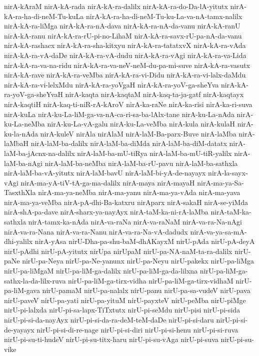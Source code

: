 {nirA-kAraM
nirA-kA-rada
nirA-kA-ra-dalilx
nirA-kA-ra-do-Da-lA-yitutx
nirA-kA-ra-ha-di-neM-Tu-kuLa
nirA-kA-ra-ha-di-neM-Tu-ku-La-va-nA-tamx-nalilx
nirA-kA-ra-liMga
nirA-kA-ra-nA-dava
nirA-kA-ra-nA-da-vanu
nirA-kA-ranU
nirA-kA-ranu
nirA-kA-ra-rU-pi-no-LihaM
nirA-kA-ra-savx-rU-pa-nA-da-vanu
nirA-kA-rashacx
nirA-kA-ra-sha-kitxyu
nirA-kA-ra-tatatxvX
nirA-kA-ra-vAda
nirA-kA-ra-vA-daDe
nirA-kA-ra-vA-dudu
nirA-kA-ra-vAgi
nirA-kA-ra-va-Lida
nirA-kA-ra-va-na-ridu
nirA-kA-ra-va-neV-neM-du-pa-mi-suve
nirA-kA-ra-vasutx
nirA-kA-rave
nirA-kA-ra-veMba
nirA-kA-ra-vi-Didu
nirA-kA-ra-vi-lalx-daMdu
nirA-kA-ra-vi-lelxMdu
nirA-kA-ra-yoVgaH
nirA-kA-ra-yoV-ga-sheYva
nirA-kA-ra-yoV-ga-sheYvaH
nirA-kaqta
nirA-kaqtaM
nirA-kaq-ta-ja-gatf
nirA-kaqtayx
nirA-kaqtiH
nirA-kaq-ti-niR-rA-kAroV
nirA-ka-raNe
nirA-ka-risi
nirA-ka-ri-suva
nirA-kuLa
nirA-ku-La-liM-ga-va-nA-ca-ri-sa-ba-lAlx-tane
nirA-ku-La-nAda
nirA-ku-La-neMba
nirA-ku-La-vA-galu
nirA-ku-La-veMba
nirA-kula
nirA-kulaH
nirA-ku-la-nAda
nirA-kuleV
nirAla
nirAlaM
nirA-laM-Ba-parx-Buve
nirA-laMba
nirA-laMbaH
nirA-laM-ba-dalilx
nirA-laM-ba-diMda
nirA-laM-ba-diM-datatx
nirA-laM-ba-jAcnx-na-dalilx
nirA-laM-ba-mU-tiRya
nirA-laM-ba-mU-tiR-yalilx
nirA-laM-ba-nAgi
nirA-laM-ba-neMba
nirA-laM-ba-rU-pavu
nirA-laM-ba-sathxla
nirA-laM-ba-vA-yitutx
nirA-laM-bavU
nirA-laM-bi-yA-de-nayayx
nirA-la-sayx-vAgi
nirA-ma-yA-tiV-tA-ga-ma-dalilx
nirA-maya
nirA-mayaH
nirA-ma-ya-Sa-TasxthXla
nirA-ma-ya-neMba
nirA-ma-yanu
nirA-ma-ya-vAda
nirA-ma-yava
nirA-ma-ya-veMba
nirA-pA-dhi-Ba-katxru
nirAparx
nirA-sakaH
nirA-se-yiMda
nirA-shA-pa-dave
nirA-sharx-ya-nayAyx
nirA-taM-ka-ni-rA-laMba
nirA-taM-ka-sathxla
nirA-tamx-ka-nAda
nirA-va-raNa
nirA-va-raNaM
nirA-va-ra-Na-nAgi
nirA-va-ra-Nana
nirA-va-ra-Nanu
nirA-va-ra-Na-vA-dadudx
nirA-va-ya-sa-mA-dhi-yalilx
nirA-yAsa
nirU-Dha-pa-shu-baM-dhAKayxM
nirU-pAda
nirU-pA-deyA
nirU-pAdhi
nirU-pA-yitutx
nirUpa
nirUpaM
nirU-pa-NA-naM-ta-ra-dalilx
nirU-paNe
nirU-pa-Neya
nirU-pa-Ne-yanunx
nirU-pa-Neyu
nirU-pakekx
nirU-pa-liMga
nirU-pa-liMgaM
nirU-pa-liM-ga-dalilx
nirU-pa-liM-ga-da-lilxna
nirU-pa-liM-ga-sathx-la-da-lilx-ruva
nirU-pa-liM-ga-tirx-vidha
nirU-pa-liM-ga-tirx-vidhaM
nirU-pa-liM-gava
nirU-pamaM
nirU-pa-nalalx
nirU-panu
nirU-pa-sa-vudeV
nirU-pava
nirU-paveV
nirU-pa-yati
nirU-pa-yituM
nirU-payxteV
nirU-peMba
nirU-piMge
nirU-pi-lalxda
nirU-pi-sa-lapx-TiTxtutx
nirU-pi-seMdu
nirU-pisi
nirU-pi-sida
nirU-pi-si-da-nayAyx
nirU-pi-si-da-ra-deM-teM-daDe
nirU-pi-si-daru
nirU-pi-si-de-yayayx
nirU-pi-si-di-re-nage
nirU-pi-si-diri
nirU-pi-si-henu
nirU-pi-si-ruva
nirU-pi-su-ti-hudeV
nirU-pi-su-titx-haru
nirU-pi-su-vAga
nirU-pi-suva
nirU-pi-su-vike
}

